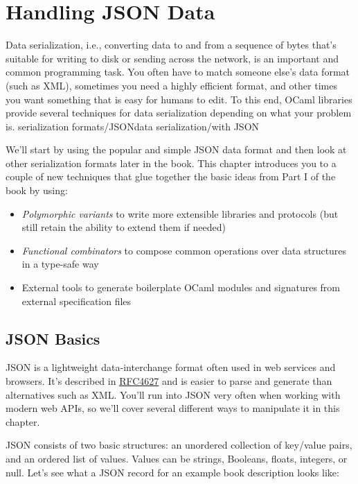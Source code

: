 \hypertarget{handling-json-data}{%
\section{Handling JSON Data}\label{handling-json-data}}

Data serialization, i.e., converting data to and from a sequence of
bytes that's suitable for writing to disk or sending across the network,
is an important and common programming task. You often have to match
someone else's data format (such as XML), sometimes you need a highly
efficient format, and other times you want something that is easy for
humans to edit. To this end, OCaml libraries provide several techniques
for data serialization depending on what your problem is.
\protect\hypertarget{SERjson}{}{serialization
formats/JSON}\protect\hypertarget{DATjson}{}{data serialization/with
JSON}

We'll start by using the popular and simple JSON data format and then
look at other serialization formats later in the book. This chapter
introduces you to a couple of new techniques that glue together the
basic ideas from Part I of the book by using:

\begin{itemize}
\item
  \emph{Polymorphic variants} to write more extensible libraries and
  protocols (but still retain the ability to extend them if needed)
\item
  \emph{Functional combinators} to compose common operations over data
  structures in a type-safe way
\item
  External tools to generate boilerplate OCaml modules and signatures
  from external specification files
\end{itemize}

\hypertarget{json-basics}{%
\subsection{JSON Basics}\label{json-basics}}

JSON is a lightweight data-interchange format often used in web services
and browsers. It's described in
\href{http://www.ietf.org/rfc/rfc4627.txt}{RFC4627} and is easier to
parse and generate than alternatives such as XML. You'll run into JSON
very often when working with modern web APIs, so we'll cover several
different ways to manipulate it in this chapter. 

JSON consists of two basic structures: an unordered collection of
key/value pairs, and an ordered list of values. Values can be strings,
Booleans, floats, integers, or null. Let's see what a JSON record for an
example book description looks like:

